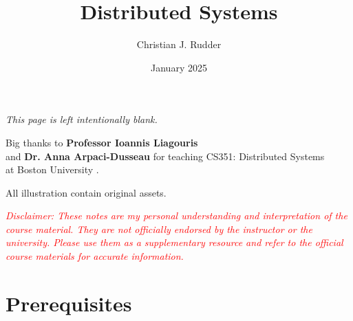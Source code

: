 \documentclass{memoir}
\title{Distributed Systems}
\author{Christian J. Rudder}
\date{January 2025}
\begin{document}
\maketitle
\setcounter{secnumdepth}{2}
\setcounter{tocdepth}{3}

\tableofcontents

\newpage
\thispagestyle{empty}
\mbox{}
\vfill
\begin{center}
    \textit{This page is left intentionally blank.}
\end{center}
\vfill
\newpage
\thispagestyle{empty}
\mbox{}
\vfill
\begin{center}
    \Large{Big thanks to \textbf{Professor Ioannis Liagouris}}\\
    and \textbf{Dr. Anna Arpaci-Dusseau} 
    \normalsize 
    for teaching CS351: Distributed Systems\\
    at Boston University \cite{liagouris_cs351}.\\
\end{center}

\vfill

\begin{center}
    \noindent All illustration contain original assets.
\end{center}
    \begin{center}
        \textcolor{red}{\textit{Disclaimer: These notes are my personal understanding and interpretation of the course material. 
        They are not officially endorsed by the instructor or the university. Please use them as a supplementary resource and refer 
        to the official course materials for accurate information.}}
    \end{center}

    \chapter*{Prerequisites}
    
    
% 
% 
% 
% 
% 
% 




\end{document}
